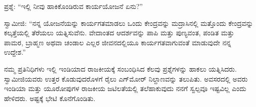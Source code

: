 ಪ್ರಶ್ನೆ: “ಇಲ್ಲಿ ನೀವು ಹಾಕಿಕೊಂಡಿರುವ ಕಾರ್ಯಯೋಜನೆ ಏನು?”

ಸ್ವಾಮೀಜಿ: “ನನ್ನ ಯೋಜನೆಯನ್ನು ಕಾರ್ಯಗತಮಾಡಲು ಒಂದು ಕೇಂದ್ರವನ್ನು ಮದ್ರಾಸಿನಲ್ಲಿ ಮತ್ತೊಂದು ಕೇಂದ್ರವನ್ನು ಕಲ್ಕತ್ತೆಯಲ್ಲಿ ತೆರೆಯಲು ಯತ್ನಿಸುವೆನು. ವೇದಾಂತದ ಆದರ್ಶವನ್ನು ಪಾಪಿ ಮತ್ತು ಪುಣ್ಯವಂತ, ಪಂಡಿತ ಮತ್ತು ಪಾಮರ, ಬ್ರಾಹ್ಮಣ ಅಥವಾ ಚಂಡಾಲ ಎಲ್ಲರ ಜೀವನದಲ್ಲಿಯೂ ಕಾರ್ಯಗತವಾಗುವಂತೆ ಮಾಡುವುದೇ ನನ್ನ ಉದ್ದೇಶ.”

ನಮ್ಮ ಪ್ರತಿನಿಧಿಗಳು ಇಲ್ಲಿ ಇಂಡಿಯಾದ ರಾಜಕೀಯಕ್ಕೆ ಸಂಬಂಧಿಸಿದ ಕೆಲವು ಪ್ರಶ್ನೆಗಳನ್ನು ಹಾಕಲು ಯತ್ನಿಸಿದರು. ಸ್ವಾಮೀಜಿಯವರು ಉತ್ತರ ಕೊಡುವುದರೊಳಗೆ ರೈಲು ಎಗ್​ಮೋರ್​ ನಿಲ್ದಾಣವನ್ನು ತಲುಪಿತು. ಅವಸರದಲ್ಲಿ ಅವರು ಇಂಡಿಯಾ ಮತ್ತು ಯೂರೋಪುಗಳ ರಾಜಕೀಯ ಜಟಿಲತೆಯಲ್ಲಿ ತಲೆಹಾಕುವುದು ನನಗೆ ಸ್ವಲ್ಪವೂ ಇಷ್ಟವಿಲ್ಲ ಎಂದು ಹೇಳಿದರು. ಅಷ್ಟಕ್ಕೆ ಭೇಟಿ ಕೊನೆಗೊಂಡಿತು.

